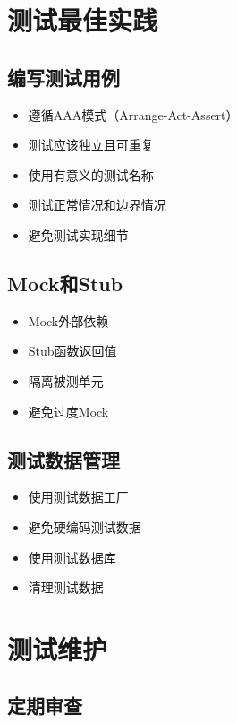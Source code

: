 \documentclass[12pt,a4paper,openany]{report}
\begin{document}
\section{测试最佳实践}

\subsection{编写测试用例}

\begin{itemize}
    \item 遵循AAA模式（Arrange-Act-Assert）
    \item 测试应该独立且可重复
    \item 使用有意义的测试名称
    \item 测试正常情况和边界情况
    \item 避免测试实现细节
\end{itemize}

\subsection{Mock和Stub}

\begin{itemize}
    \item Mock外部依赖
    \item Stub函数返回值
    \item 隔离被测单元
    \item 避免过度Mock
\end{itemize}

\subsection{测试数据管理}

\begin{itemize}
    \item 使用测试数据工厂
    \item 避免硬编码测试数据
    \item 使用测试数据库
    \item 清理测试数据
\end{itemize}

\section{测试维护}

\subsection{定期审查}
\end{document}
